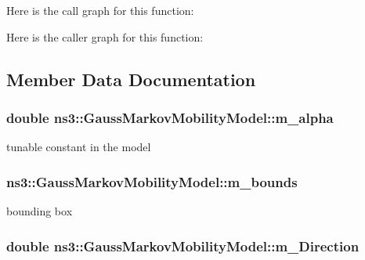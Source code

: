 Here is the call graph for this function\+:




Here is the caller graph for this function\+:




\subsection{Member Data Documentation}
\subsubsection[{\texorpdfstring{m\+\_\+alpha}{m_alpha}}]{\setlength{\rightskip}{0pt plus 5cm}double ns3\+::\+Gauss\+Markov\+Mobility\+Model\+::m\+\_\+alpha\hspace{0.3cm}{\ttfamily [private]}}\hypertarget{classns3_1_1GaussMarkovMobilityModel_aeb2ea990f5ea57e38cf53470f613863c}{}\label{classns3_1_1GaussMarkovMobilityModel_aeb2ea990f5ea57e38cf53470f613863c}


tunable constant in the model 

\subsubsection[{\texorpdfstring{m\+\_\+bounds}{m_bounds}}]{ ns3\+::\+Gauss\+Markov\+Mobility\+Model\+::m\+\_\+bounds\hspace{0.3cm}{\ttfamily [private]}}\hypertarget{classns3_1_1GaussMarkovMobilityModel_a067131b9dbb814e9f9f1715cb779fc73}{}\label{classns3_1_1GaussMarkovMobilityModel_a067131b9dbb814e9f9f1715cb779fc73}


bounding box 

\subsubsection[{\texorpdfstring{m\+\_\+\+Direction}{m_Direction}}]{\setlength{\rightskip}{0pt plus 5cm}double ns3\+::\+Gauss\+Markov\+Mobility\+Model\+::m\+\_\+\+Direction\hspace{0.3cm}{\ttfamily [private]}}\hypertarget{classns3_1_1GaussMarkovMobilityModel_aefd02209b40ab19df332f788ea7654c2}{}\label{classns3_1_1GaussMarkovMobilityModel_aefd02209b40ab19df332f788ea7654c2}


